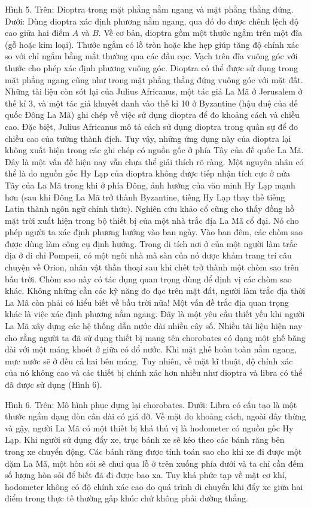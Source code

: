 \begin{multicols}{2}
	Hình 5. Trên: Dioptra trong mặt phẳng nằm ngang và mặt phẳng thẳng đứng. Dưới: Dùng dioptra xác định phương nằm ngang, qua đó đo được chênh lệch độ cao giữa hai điểm $A$ và $B$.
	Về cơ bản, dioptra gồm một thước ngắm trên một đĩa (gỗ hoặc kim loại). Thước ngắm có lỗ tròn hoặc khe hẹp giúp tăng độ chính xác so với chỉ ngắm bằng mắt thường qua các đầu cọc. Vạch trên đĩa vuông góc với thước cho phép xác định phương vuông góc. Dioptra có thể được sử dụng trong mặt phẳng ngang cũng như trong mặt phẳng thẳng đứng vuông góc với mặt đất.
	Những tài liệu còn sót lại của Julius Africanus, một tác giả La Mã ở Jerusalem ở thế kỉ 3, và một tác giả khuyết danh vào thế kỉ 10 ở Byzantine (hậu duệ của đế quốc Đông La Mã) ghi chép về việc sử dụng dioptra để đo khoảng cách và chiều cao. Đặc biệt, Julius Africanus mô tả cách sử dụng dioptra trong quân sự để đo chiều cao của tường thành địch. Tuy vậy, những ứng dụng này của dioptra lại không xuất hiện trong các ghi chép có nguồn gốc ở phía Tây của đế quốc La Mã. Đây là một vấn đề hiện nay vẫn chưa thể giải thích rõ ràng. Một nguyên nhân có thể là do nguồn gốc Hy Lạp của dioptra không được tiếp nhận tích cực ở nửa Tây của La Mã trong khi ở phía Đông, ảnh hưởng của văn minh Hy Lạp mạnh hơn (sau khi Đông La Mã trở thành Byzantine, tiếng Hy Lạp thay thế tiếng Latin thành ngôn ngữ chính thức).
	Nghiên cứu khảo cổ cũng cho thấy đồng hồ mặt trời xuất hiện trong bộ thiết bị của một nhà trắc địa La Mã cổ đại. Nó cho phép người ta xác định phương hướng vào ban ngày. Vào ban đêm, các chòm sao được dùng làm công cụ định hướng. Trong di tích nơi ở của một người làm trắc địa ở di chỉ Pompeii, có một ngôi nhà mà  sàn của nó được khảm trang trí câu chuyện về Orion, nhân vật thần thoại sau khi chết trở thành một chòm sao trên bầu trời. Chòm sao này có tác dụng quan trọng dùng để định vị các chòm sao khác. Không những cần các kỹ năng đo đạc trên mặt đất, người làm trắc địa thời La Mã còn phải có hiểu biết về bầu trời nữa!
	Một vấn đề trắc địa quan trọng khác là việc xác định phương nằm ngang. Đây là một yêu cầu thiết yếu khi người La Mã xây dựng các hệ thống dẫn nước dài nhiều cây số. Nhiều tài liệu hiện nay cho rằng người ta đã sử dụng thiết bị mang tên chorobates có dạng một ghế băng dài với một máng khoét ở giữa có đổ nước. Khi mặt ghế hoàn toàn nằm ngang, mực nước sẽ ở đều cả hai bên máng. Tuy nhiên, về mặt kĩ thuật, độ chính xác của nó không cao và các thiết bị chính xác hơn nhiều như dioptra và libra có thể đã được sử dụng (Hình 6). 
	
	
	Hình 6. Trên: Mô hình phục dựng lại chorobates. Dưới: Libra có cấu tạo là một thước ngắm dạng đòn cân dài có giá đỡ.
	Về mặt đo khoảng cách, ngoài dây thừng và gậy, người La Mã có một thiết bị khá thú vị là hodometer có nguồn gốc Hy Lạp. Khi người sử dụng đẩy xe, trục bánh xe sẽ kéo theo các bánh răng bên trong xe chuyển động. Các bánh răng được tính toán sao cho khi xe đi được một dặm La Mã, một hòn sỏi sẽ chui qua lỗ ở trên xuống phía dưới và ta chỉ cần đếm số lượng hòn sỏi để biết đã đi được bao xa. Tuy khá phức tạp về mặt cơ khí, hodometer không có độ chính xác cao do quá trình di chuyển khi đẩy xe giữa hai điểm trong thực tế thường gấp khúc chứ không phải đường thẳng.
	

\end{multicols}
